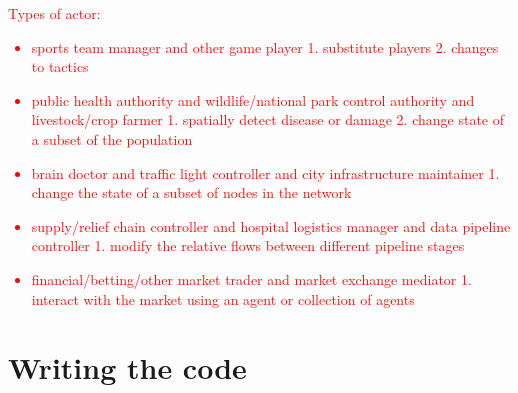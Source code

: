 \textcolor{red}{Types of actor:
\begin{itemize}
\item{sports team manager and other game player 1. substitute players 2. changes to tactics}
\item{public health authority and wildlife/national park control authority and livestock/crop farmer 1. spatially detect disease or damage 2. change state of a subset of the population}
\item{brain doctor and traffic light controller and city infrastructure maintainer 1. change the state of a subset of nodes in the network}
\item{supply/relief chain controller and hospital logistics manager and data pipeline controller 1. modify the relative flows between different pipeline stages}
\item{financial/betting/other market trader and market exchange mediator 1. interact with the market using an agent or collection of agents}
\end{itemize}}

\section{\sffamily Writing the code}


